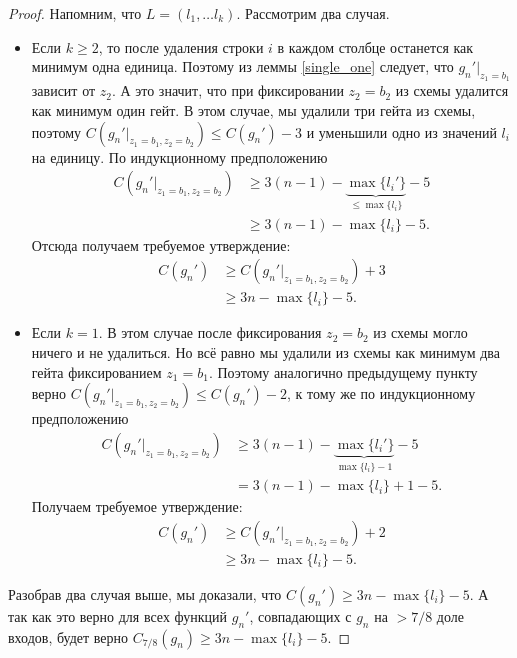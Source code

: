 \documentclass[a4paper, 14pt]{extarticle}
\begin{document}
\begin{proof}
Напомним, что $L = (l_1, \dots l_k)$. Рассмотрим два случая.
\begin{itemize}
\item Если $k \geq 2$, то после удаления строки $i$ в каждом столбце останется
как минимум одна единица. Поэтому из леммы \ref{single_one} следует, что
$g_n' \rvert _ {z_1 = b_1}$ зависит от $z_2$. А это значит, что при фиксировании
$z_2 = b_2$ из схемы удалится как минимум один гейт. В этом случае, мы удалили
три гейта из схемы, поэтому $C(g_n' \rvert _ {z_1 = b_1, z_2 = b_2}) \leq C(g_n') - 3$
и уменьшили одно из значений $l_i$ на единицу. По индукционному предположению
\[
\begin{aligned}
C(g_n' \rvert _ {z_1 = b_1, z_2 = b_2}) &\geq 3(n - 1) - \underbrace{\max \{l_i'\}}_{\leq \max \{l_i\}} - 5 \\
&\geq 3(n - 1) - \max \{l_i\} - 5.
\end{aligned}
\]
Отсюда получаем требуемое утверждение:
\[
\begin{aligned}
C(g_n') &\geq C(g_n' \rvert _ {z_1 = b_1, z_2 = b_2}) + 3 \\
        &\geq 3n - \max \{l_i\} - 5.
\end{aligned}
\]

\item Если $k = 1$. В этом случае после фиксирования $z_2 = b_2$ из схемы могло
ничего и не удалиться. Но всё равно мы удалили из схемы как минимум два гейта
фиксированием $z_1 = b_1$. Поэтому аналогично предыдущему пункту верно $C(g_n'
\rvert _ {z_1 = b_1, z_2 = b_2}) \leq C(g_n') - 2$, к тому же по индукционному
предположению
\[
\begin{aligned}
C(g_n' \rvert _ {z_1 = b_1, z_2 = b_2}) &\geq 3(n - 1) - \underbrace{\max \{l_i'\}}_{\max \{l_i\} - 1} - 5 \\
&= 3(n - 1) - \max \{l_i\} + 1 - 5.
\end{aligned}
\]
Получаем требуемое утверждение:
\[
\begin{aligned}
C(g_n') &\geq C(g_n' \rvert _ {z_1 = b_1, z_2 = b_2}) + 2 \\
        &\geq 3n - \max \{l_i\} - 5.
\end{aligned}
\]
\end{itemize}

Разобрав два случая выше, мы доказали, что $C(g_n') \geq 3n - \max \{l_i\} - 5$.
А так как это верно для всех функций $g_n'$, совпадающих с $g_n$ на $>7/8$ доле
входов, будет верно $C_{7/8}(g_n) \geq 3n - \max \{l_i\} - 5$.
\end{proof}
\end{document}
